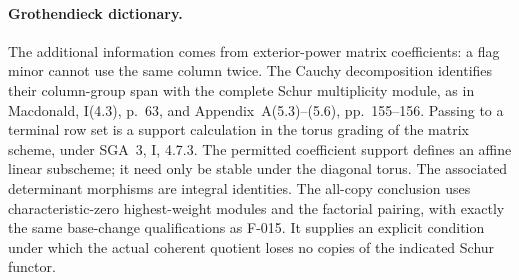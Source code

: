 \paragraph{Grothendieck dictionary.}
The additional information comes from exterior-power matrix
coefficients: a flag minor cannot use the same column twice.
The Cauchy decomposition identifies their column-group span
with the complete Schur multiplicity module, as in Macdonald,
I(4.3), p.~63, and Appendix~A(5.3)--(5.6), pp.~155--156.
Passing to a terminal row set is a support calculation in the
torus grading of the matrix scheme, under SGA~3, I, 4.7.3.
The permitted coefficient support defines an affine linear
subscheme; it need only be stable under the diagonal torus.
The associated determinant morphisms are integral identities.
The all-copy conclusion uses characteristic-zero highest-weight
modules and the factorial pairing, with exactly the same
base-change qualifications as F-015. It supplies an explicit
condition under which the actual coherent quotient loses no
copies of the indicated Schur functor.

